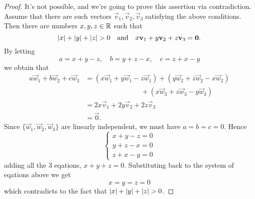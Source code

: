 \begin{proof}
  It's not possible, and we're going to prove this assertion via contradiction.
  Assume that there are such vectors $\vec{v}_1,\vec{v}_2,\vec{v}_3$
  satisfying the above conditions. Then there are numbers $x,y,z\in\mathbb{R}$
  such that
  \[
    \lvert x\rvert+\lvert y\rvert+\lvert z\rvert>0
    \quad\text{and}\quad
    x\mathbf{v}_1+y\mathbf{v}_2+z\mathbf{v}_3=\mathbf{0}.
  \]
  By letting 
  \[a=x+y-z,\quad b=y+z-x,\quad c=z+x-y\]
  we obtain that
  \begin{align*}
    a\vec{w}_1+b\vec{w}_2+c\vec{w}_3
    &=(x\vec{w}_1+y\vec{w}_1-z\vec{w}_1)
     +(y\vec{w}_2+z\vec{w}_2-x\vec{w}_2)\\
    &\qquad\qquad\qquad\qquad +(x\vec{w}_3+z\vec{w}_3-y\vec{w}_3)\\
    &=2x\vec{v}_1+2y\vec{v}_2+2z\vec{v}_3\\
    &=\vec{0}.
  \end{align*}
  Since $\{\vec{w}_1,\vec{w}_2,\vec{w}_3\}$
  are linearly independent, we must have $a=b=c=0$. Hence
  \[
    \begin{cases}
      x+y-z=0\\
      y+z-x=0\\
      z+x-y=0
    \end{cases}
  \]
  adding all the 3 eqations, $x+y+z=0$. Substituting back to the 
  system of eqations above we get
  \[x=y=z=0\]
  which contradicts to the fact that $\lvert x\rvert+\lvert y\rvert+\lvert z\rvert>0$.
\end{proof}


